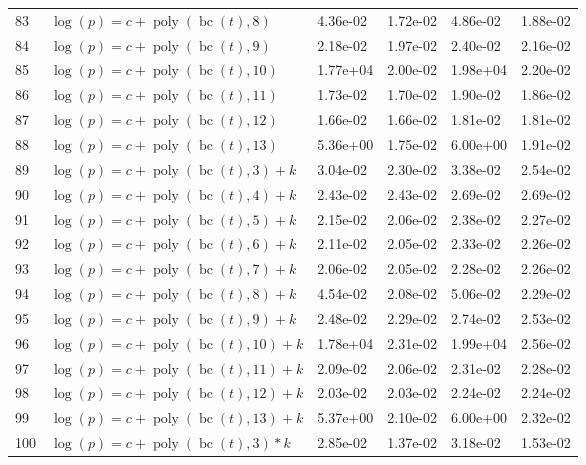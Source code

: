 \documentclass[12pt,a4paper]{article}
\DeclareMathOperator{\bc}{bc}
\DeclareMathOperator{\poly}{poly}
\begin{document}
\begin{longtable}[t]{ll>{\raggedleft\arraybackslash}p{2cm}>{\raggedleft\arraybackslash}p{2cm}>{\raggedleft\arraybackslash}p{2cm}>{\raggedleft\arraybackslash}p{2cm}}
\rowcolor{gray!6}  83 & $\log(p) = c + \poly\left( \bc(t), 8 \right)$ & 4.36e-02 & 1.72e-02 & 4.86e-02 & 1.88e-02\\
84 & $\log(p) = c + \poly\left( \bc(t), 9 \right)$ & 2.18e-02 & 1.97e-02 & 2.40e-02 & 2.16e-02\\
\rowcolor{gray!6}  85 & $\log(p) = c + \poly\left( \bc(t), 10 \right)$ & 1.77e+04 & 2.00e-02 & 1.98e+04 & 2.20e-02\\
86 & $\log(p) = c + \poly\left( \bc(t), 11 \right)$ & 1.73e-02 & 1.70e-02 & 1.90e-02 & 1.86e-02\\
\rowcolor{gray!6}  87 & $\log(p) = c + \poly\left( \bc(t), 12 \right)$ & 1.66e-02 & 1.66e-02 & 1.81e-02 & 1.81e-02\\
88 & $\log(p) = c + \poly\left( \bc(t), 13 \right)$ & 5.36e+00 & 1.75e-02 & 6.00e+00 & 1.91e-02\\
\rowcolor{gray!6}  89 & $\log(p) = c + \poly\left( \bc(t), 3 \right) + k$ & 3.04e-02 & 2.30e-02 & 3.38e-02 & 2.54e-02\\
90 & $\log(p) = c + \poly\left( \bc(t), 4 \right) + k$ & 2.43e-02 & 2.43e-02 & 2.69e-02 & 2.69e-02\\
\rowcolor{gray!6}  91 & $\log(p) = c + \poly\left( \bc(t), 5 \right) + k$ & 2.15e-02 & 2.06e-02 & 2.38e-02 & 2.27e-02\\
92 & $\log(p) = c + \poly\left( \bc(t), 6 \right) + k$ & 2.11e-02 & 2.05e-02 & 2.33e-02 & 2.26e-02\\
\rowcolor{gray!6}  93 & $\log(p) = c + \poly\left( \bc(t), 7 \right) + k$ & 2.06e-02 & 2.05e-02 & 2.28e-02 & 2.26e-02\\
94 & $\log(p) = c + \poly\left( \bc(t), 8 \right) + k$ & 4.54e-02 & 2.08e-02 & 5.06e-02 & 2.29e-02\\
\rowcolor{gray!6}  95 & $\log(p) = c + \poly\left( \bc(t), 9 \right) + k$ & 2.48e-02 & 2.29e-02 & 2.74e-02 & 2.53e-02\\
96 & $\log(p) = c + \poly\left( \bc(t), 10 \right) + k$ & 1.78e+04 & 2.31e-02 & 1.99e+04 & 2.56e-02\\
\rowcolor{gray!6}  97 & $\log(p) = c + \poly\left( \bc(t), 11 \right) + k$ & 2.09e-02 & 2.06e-02 & 2.31e-02 & 2.28e-02\\
98 & $\log(p) = c + \poly\left( \bc(t), 12 \right) + k$ & 2.03e-02 & 2.03e-02 & 2.24e-02 & 2.24e-02\\
\rowcolor{gray!6}  99 & $\log(p) = c + \poly\left( \bc(t), 13 \right) + k$ & 5.37e+00 & 2.10e-02 & 6.00e+00 & 2.32e-02\\
100 & $\log(p) = c + \poly\left( \bc(t), 3 \right) * k$ & 2.85e-02 & 1.37e-02 & 3.18e-02 & 1.53e-02\\

\end{longtable}
\end{document}
